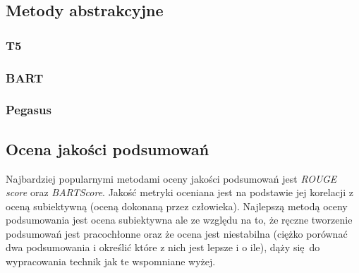 \documentclass{article}
\begin{document}
\subsection{Metody abstrakcyjne}

\subsubsection{T5}
\subsubsection{BART}
\subsubsection{Pegasus}

\subsection{Ocena jakości podsumowań}
Najbardziej popularnymi metodami oceny jakości podsumowań jest \textit{ROUGE score} oraz
\textit{BARTScore}. Jakość metryki oceniana jest na podstawie jej korelacji z oceną
subiektywną (oceną dokonaną przez człowieka). Najlepszą metodą oceny podsumowania jest 
ocena subiektywna ale ze względu na to, że ręczne tworzenie podsumowań jest pracochłonne oraz że
ocena jest niestabilna (ciężko porównać dwa podsumowania i określić które z nich jest lepsze
i o ile), dąży się do wypracowania technik jak te wspomniane wyżej. 
\end{document}
